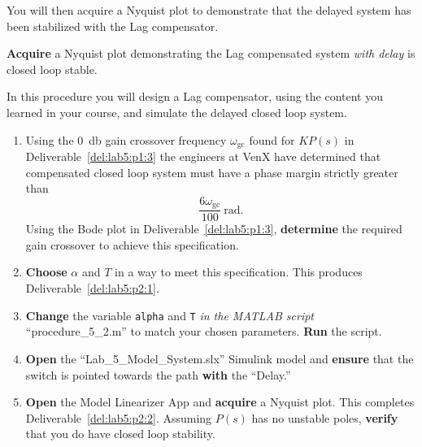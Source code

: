 %
You will then acquire a Nyquist plot to demonstrate that the delayed system has been stabilized with the Lag compensator.
%
\begin{deliverable}[label={del:lab5:p2:2}]
  \textbf{Acquire} a Nyquist plot demonstrating the Lag compensated system \emph{with delay} is closed loop stable.
\end{deliverable}
%
\begin{procedure}[label={proc:lab5:2}]
  In this procedure you will design a Lag compensator, using the content you learned in your course, and simulate the delayed closed loop system.
  \begin{enumerate}[label={(\arabic*)}]
    \item{%
      Using the \SI{0}{\decibel} gain crossover frequency \(\omega_\mathrm{gc}\) found for \(K P(s)\) in Deliverable~\ref{del:lab5:p1:3} the engineers at VenX have determined that compensated closed loop system must have a phase margin strictly greater than
      \[
        \frac{6\omega_\mathrm{gc}}{100}~\mathrm{rad}.
      \]
      Using the Bode plot in Deliverable~\ref{del:lab5:p1:3}, \textbf{determine} the required gain crossover to achieve this specification.
    }
    \item{%
      \textbf{Choose} \(\alpha\) and \(T\) in a way to meet this specification.
      This produces Deliverable~\ref{del:lab5:p2:1}.
    }
    \item{%
      \textbf{Change} the variable \texttt{alpha} and \texttt{T} \emph{in the MATLAB script} ``procedure\_5\_2.m'' to match your chosen parameters.
      \textbf{Run} the script.
    }
    \item{%
      \textbf{Open} the ``Lab\_5\_Model\_System.slx'' Simulink model and \textbf{ensure} that the switch is pointed towards the path \textbf{with} the ``Delay.''
    }
    \item{%
      \textbf{Open} the Model Linearizer App and \textbf{acquire} a Nyquist plot.
      This completes Deliverable~\ref{del:lab5:p2:2}.
      Assuming \(P(s)\) has no unstable poles, \textbf{verify} that you do  have closed loop stability.
    }
  \end{enumerate}
\end{procedure}

